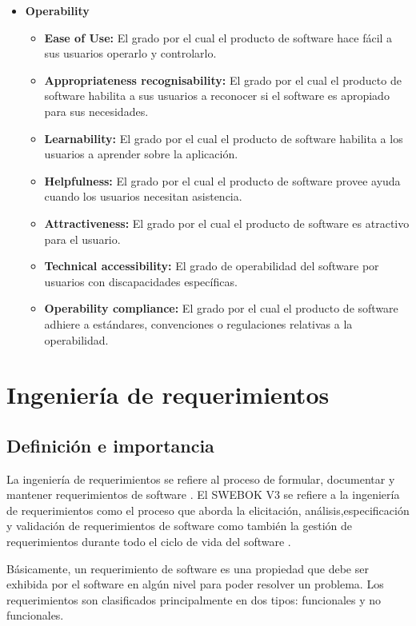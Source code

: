 \begin{itemize}
	\item \textbf{Operability}
		\begin{itemize}
		\item \textbf{Ease of Use:} El grado por el cual el producto de software hace fácil a sus usuarios
			operarlo y controlarlo.
		\item \textbf{Appropriateness recognisability:} El grado por el cual el producto de software habilita a sus
			usuarios a reconocer si el software es apropiado para sus necesidades.
		\item \textbf{Learnability:} El grado por el cual el producto de software habilita a los usuarios a aprender
			sobre la aplicación.
		\item \textbf{Helpfulness:} El grado por el cual el producto de software provee ayuda cuando los
			usuarios necesitan asistencia.
		\item \textbf{Attractiveness:}  El grado por el cual el producto de software es atractivo para el usuario.
		\item \textbf{Technical accessibility:}  El grado de operabilidad del software por usuarios con
			discapacidades específicas.
		\item \textbf{Operability compliance:} El grado por el cual el producto de software adhiere a estándares, convenciones
			o regulaciones relativas a la operabilidad.
		\end{itemize}

		
\end{itemize}


\cleardoublepage
\section{Ingeniería de requerimientos}
\subsection{Definición e importancia}

La ingeniería de requerimientos se refiere al proceso de formular, documentar
y mantener requerimientos de software \cite{Sommerville1998}. El SWEBOK V3
se refiere a la ingeniería de requerimientos como el proceso que aborda la elicitación, 
análisis,especificación y validación de requerimientos de software como también
la gestión de requerimientos durante todo el ciclo de vida del software \cite{IEEEComputerSociety2013}.

Básicamente, un requerimiento de software es una propiedad que 
debe ser exhibida por el software en algún nivel para poder resolver un problema. Los 
requerimientos son clasificados principalmente en dos tipos: funcionales y no funcionales.


